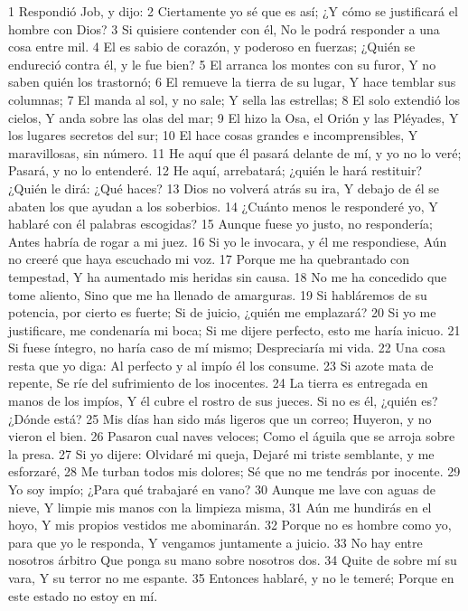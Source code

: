 1 Respondió Job, y dijo:  
2 Ciertamente yo sé que es así;  
¿Y cómo se justificará el hombre con Dios?  
3 Si quisiere contender con él,  
No le podrá responder a una cosa entre mil.  
4 El es sabio de corazón, y poderoso en fuerzas;  
¿Quién se endureció contra él, y le fue bien?  
5 El arranca los montes con su furor,  
Y no saben quién los trastornó;  
6 El remueve la tierra de su lugar,  
Y hace temblar sus columnas;  
7 El manda al sol, y no sale;  
Y sella las estrellas;  
8 El solo extendió los cielos,  
Y anda sobre las olas del mar;  
9 El hizo la Osa, el Orión y las Pléyades, 
Y los lugares secretos del sur; 
10 El hace cosas grandes e incomprensibles,  
Y maravillosas, sin número.  
11 He aquí que él pasará delante de mí, y yo no lo veré;  
Pasará, y no lo entenderé.  
12 He aquí, arrebatará; ¿quién le hará restituir?  
¿Quién le dirá: ¿Qué haces?  
13 Dios no volverá atrás su ira,  
Y debajo de él se abaten los que ayudan a los soberbios.  
14 ¿Cuánto menos le responderé yo,  
Y hablaré con él palabras escogidas?  
15 Aunque fuese yo justo, no respondería;  
Antes habría de rogar a mi juez.  
16 Si yo le invocara, y él me respondiese,  
Aún no creeré que haya escuchado mi voz.  
17 Porque me ha quebrantado con tempestad,  
Y ha aumentado mis heridas sin causa. 
18 No me ha concedido que tome aliento,  
Sino que me ha llenado de amarguras.  
19 Si habláremos de su potencia, por cierto es fuerte;  
Si de juicio, ¿quién me emplazará?  
20 Si yo me justificare, me condenaría mi boca;  
Si me dijere perfecto, esto me haría inicuo.  
21 Si fuese íntegro, no haría caso de mí mismo;  
Despreciaría mi vida.  
22 Una cosa resta que yo diga: 
Al perfecto y al impío él los consume.  
23 Si azote mata de repente,  
Se ríe del sufrimiento de los inocentes.  
24 La tierra es entregada en manos de los impíos,  
Y él cubre el rostro de sus jueces.  
Si no es él, ¿quién es? ¿Dónde está?  
25 Mis días han sido más ligeros que un correo;  
Huyeron, y no vieron el bien.  
26 Pasaron cual naves veloces;  
Como el águila que se arroja sobre la presa.  
27 Si yo dijere: Olvidaré mi queja,  
Dejaré mi triste semblante, y me esforzaré, 
28 Me turban todos mis dolores;  
Sé que no me tendrás por inocente.  
29 Yo soy impío;  
¿Para qué trabajaré en vano?  
30 Aunque me lave con aguas de nieve,  
Y limpie mis manos con la limpieza misma,  
31 Aún me hundirás en el hoyo,  
Y mis propios vestidos me abominarán.  
32 Porque no es hombre como yo, para que yo le responda,  
Y vengamos juntamente a juicio.  
33 No hay entre nosotros árbitro  
Que ponga su mano sobre nosotros dos. 
34 Quite de sobre mí su vara,  
Y su terror no me espante.  
35 Entonces hablaré, y no le temeré;  
Porque en este estado no estoy en mí.  

